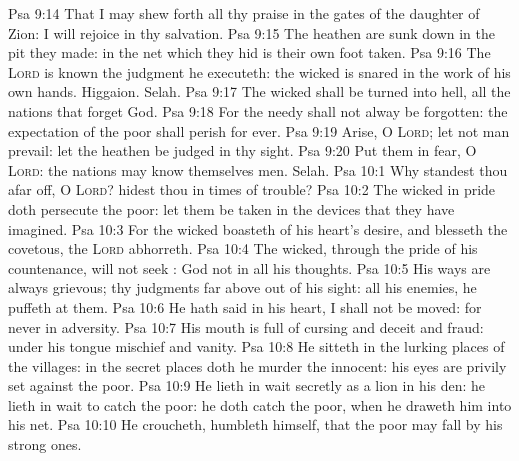 \vs Psa 9:14 That I may shew forth all thy praise in the gates of the daughter of Zion: I will rejoice in thy salvation.
\vs Psa 9:15 The heathen are sunk down in the pit  they made: in the net which they hid is their own foot taken.
\vs Psa 9:16 The \textsc{Lord} is known  the judgment  he executeth: the wicked is snared in the work of his own hands. Higgaion. Selah.
\vs Psa 9:17 The wicked shall be turned into hell,  all the nations that forget God.
\vs Psa 9:18 For the needy shall not alway be forgotten: the expectation of the poor shall  perish for ever.
\vs Psa 9:19 Arise, O \textsc{Lord}; let not man prevail: let the heathen be judged in thy sight.
\vs Psa 9:20 Put them in fear, O \textsc{Lord}:  the nations may know themselves  men. Selah.
\vs Psa 10:1 Why standest thou afar off, O \textsc{Lord}?  hidest thou  in times of trouble?
\vs Psa 10:2 The wicked in  pride doth persecute the poor: let them be taken in the devices that they have imagined.
\vs Psa 10:3 For the wicked boasteth of his heart's desire, and blesseth the covetous,  the \textsc{Lord} abhorreth.
\vs Psa 10:4 The wicked, through the pride of his countenance, will not seek : God  not in all his thoughts.
\vs Psa 10:5 His ways are always grievous; thy judgments  far above out of his sight:  all his enemies, he puffeth at them.
\vs Psa 10:6 He hath said in his heart, I shall not be moved: for  never  in adversity.
\vs Psa 10:7 His mouth is full of cursing and deceit and fraud: under his tongue  mischief and vanity.
\vs Psa 10:8 He sitteth in the lurking places of the villages: in the secret places doth he murder the innocent: his eyes are privily set against the poor.
\vs Psa 10:9 He lieth in wait secretly as a lion in his den: he lieth in wait to catch the poor: he doth catch the poor, when he draweth him into his net.
\vs Psa 10:10 He croucheth,  humbleth himself, that the poor may fall by his strong ones.

